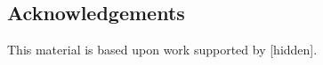 %
%


\subsection*{Acknowledgements}
\noindent This material is based upon work supported by [hidden].


